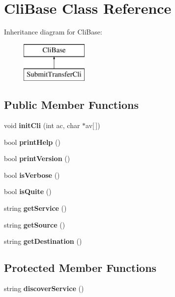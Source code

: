 \section{CliBase Class Reference}
\label{classCliBase}
Inheritance diagram for CliBase:\begin{figure}[H]
\begin{center}
\leavevmode
\includegraphics[height=2.000000cm]{classCliBase}
\end{center}
\end{figure}
\subsection*{Public Member Functions}
\begin{DoxyCompactItemize}
\item 
void {\bfseries initCli} (int ac, char $\ast$av[$\,$])\label{classCliBase_a4bd2ca28f56f6423d7d3f01c1749f0f5}

\item 
bool {\bfseries printHelp} ()\label{classCliBase_aa20d5af1689dbb8d5dc59cb050b2be6a}

\item 
bool {\bfseries printVersion} ()\label{classCliBase_a62246bf8d045ba1dcf9b2620fefe7a49}

\item 
bool {\bfseries isVerbose} ()\label{classCliBase_af5f028e631157613fee035627f753410}

\item 
bool {\bfseries isQuite} ()\label{classCliBase_a3f88608927308c1b0d7504b9ff126374}

\item 
string {\bfseries getService} ()\label{classCliBase_a98d6e23a92238d5b364abc488e2aca4f}

\item 
string {\bfseries getSource} ()\label{classCliBase_a5a35901fc89ccac29bc7ccd00b13ea15}

\item 
string {\bfseries getDestination} ()\label{classCliBase_ad73c2f9744627774b0d0dcc7f43780fb}

\end{DoxyCompactItemize}
\subsection*{Protected Member Functions}
\begin{DoxyCompactItemize}
\item 
string {\bfseries discoverService} ()\label{classCliBase_aba9d7a499eaf393077ba31bd133dafca}

\end{DoxyCompactItemize}
